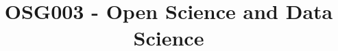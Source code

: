 \documentclass{article}
\begin{document}
\title{OSG003 - Open Science and Data Science}

\maketitle
\end{document}
